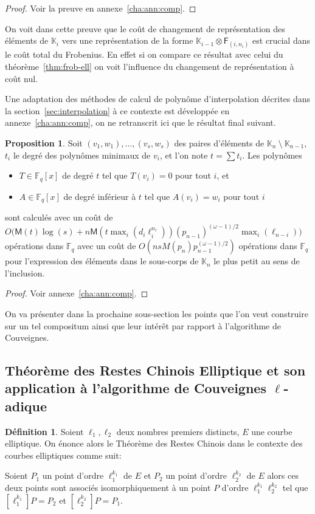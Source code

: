 \documentclass[10pt,a4paper]{book}
\theoremstyle{plain}
\theoremstyle{definition}
\theoremstyle{definition}
\theoremstyle{definition}
\newtheorem{prop}[thm]{Proposition}
\theoremstyle{definition}
\newtheorem{defi}[thm]{Définition}
\theoremstyle{remark}
\theoremstyle{remark}
\theoremstyle{definition}
\begin{document}
\begin{proof}
Voir la preuve en annexe~\ref{cha:ann:comp}.
\end{proof}


On voit dans cette preuve que le coût de changement de représentation des 
éléments de $\mathbb{K}_i$ vers une représentation de la forme 
$\mathbb{K}_{i-1} \otimes \mathsf{F}_{(i,n_i)}$ est crucial dans le coût total
du Frobenius. En effet si on compare ce résultat avec celui du 
théorème~\ref{thm:frob-ell} on voit l'influence du changement de représentation
à coût nul.

Une adaptation des méthodes de calcul de polynôme d'interpolation décrites dans
la section~\ref{sec:interpolation} à ce contexte est développée en 
annexe~\ref{cha:ann:comp}, on ne retranscrit ici que le résultat final suivant.

\begin{prop}\label{prop:interpol:comp}
  Soit $(v_1,w_1),\dots,(v_s,w_s)$ des paires d'éléments de $\mathbb{K}_n~\setminus~\mathbb{K}_{n-1}$, $t_i$ le degré des polynômes minimaux de $v_i$, 
  et l'on note  $t=\sum t_i$. 
  Les polynômes
  \begin{itemize}
  \item $T\in \mathbb{F}_q[x]$ de degré $t$ tel que $T(v_i)=0$ pour tout $i$,
    et
  \item $A\in \mathbb{F}_q[x]$ de degré inférieur à $t$ tel que $A(v_i)=w_i$ pour
    tout $i$
  \end{itemize}
  sont calculés avec un coût de
  $O\bigl(\mathsf{M}(t)\log(s) + n\mathsf{M}(t \max_i(d_i\ell_i^{n_i}))(p_{n-1})^{(\omega-1)/2} \max_{i}(\ell_{n-i})\bigr)$ 
  opérations dans $\mathbb{F}_q$ avec un coût de 
  $O(nsM(p_n)p_{n-1}^{(\omega-1)/2})$ opérations dans $\mathbb{F}_q$ pour 
  l'expression des éléments dans le sous-corps de $\mathbb{K}_n$ le plus petit 
  au sens de l'inclusion.
\end{prop}

\begin{proof}
Voir annexe~\ref{cha:ann:comp}.
\end{proof}

On va présenter dans la prochaine sous-section les points que l'on veut 
construire sur un tel compositum ainsi que leur intérêt par rapport à 
l'algorithme de Couveignes.

\subsection{Théorème des Restes Chinois Elliptique et son application à l'algorithme de Couveignes $\ell$-adique}
\label{sub:TRCE:cou}
\begin{defi}
Soient $\ell_1, \ell_2$ deux nombres premiers distincts, $E$ une courbe 
elliptique. On énonce alors le Théorème des Restes Chinois dans le contexte des
courbes elliptiques comme suit:

Soient $P_1$ un point d'ordre $\ell_1^{k_1}$ de $E$ et $P_2$ un point d'ordre $\ell_2^{k_2}$ de $E$ alors ces deux points sont associés isomorphiquement à un point $P$ d'ordre $\ell_1^{k_1}\ell_2^{k_2}$ tel que $[\ell_1^{k_1}]P=P_2$ et $[\ell_2^{k_2}]P=P_1$.
\end{defi}
\end{document}
